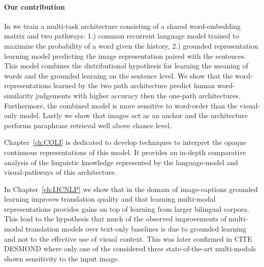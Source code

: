 \paragraph{Our contribution}


In \citep{chrupala2015learning} we train a multi-task architecture consisting
of a shared word-embedding matrix and two pathways: 1.) common recurrent language
model trained to maximize the probability of a word given the history,
2.) grounded representation learning model predicting the image representation paired with the sentences.
This model combines the distributional hypothesis for learning the meaning of words
and the grounded learning on the sentence level.
We show that the word-representations learned by the two path architecture
predict human word-similarity judgements with higher accuracy then the one-path
architectures. Furthermore, the combined model is more sensitive to word-order than
the visual-only model.  Lastly we show that images act as an
anchor and the architecture performs paraphrase retrieval well above chance
level.

Chapter~\ref{ch:COLI} is dedicated to develop techniques to interpret the
opaque continuous representations of this model. It provides an in-depth
comparative analysis of the linguistic knowledge represented by the
language-model and visual-pathways of this architecture.

In Chapter~\ref{ch:IJCNLP} we show that in the domain of image-captions
grounded learning improves translation quality and that learning multi-modal
representations provides gains on top of learning from larger bilingual corpora.
This lead to the hypothesis that much of the observed improvements of
multi-modal translation models over text-only baselines is due to grounded
learning and not to the effective use of visual context. This was later confirmed
in CITE DESMOND where only one of the considered three state-of-the-art multi-modals
shown sensitivity to the input image.


